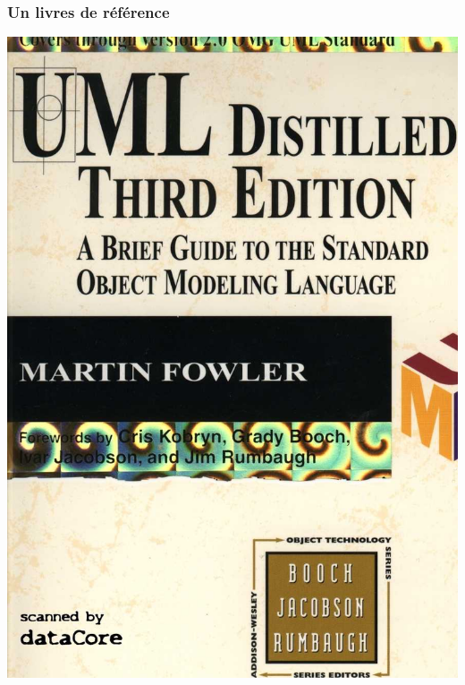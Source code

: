 \begin{frame}
    \frametitle{Un livres de référence}
    \centering
    \includegraphics[height=0.5\linewidth]{figures/uml/uml-book}
\end{frame}
